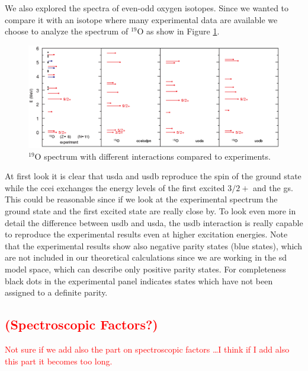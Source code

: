 \documentclass{llncs}
\begin{document}
We also explored the spectra of even-odd oxygen isotopes. Since we wanted to compare it with an isotope where many experimental data are available we choose to analyze the spectrum of $^{19}$O as show in Figure \ref{fig:19O}. 
\begin{figure}[htb!]
\centering
\includegraphics[width=\textwidth]{19O.eps}
\caption{$^{19}$O spectrum with different interactions compared to experiments.}
\label{fig:19O}
\end{figure}
At first look it is clear that usda and usdb reproduce the spin of the ground state while the ccei exchanges the energy levels of the first excited $3/2+$ and the gs. This could be reasonable since if we look at the experimental spectrum the ground state and the first excited state are really close by. To look even more in detail the difference between usdb and usda, the usdb interaction is really capable to reproduce the experimental results even at higher excitation energies. Note that the experimental results show also negative parity states (blue states), which are not included in our theoretical calculations since we are working in the sd model space, which can  describe only positive parity states. For completeness black dots in the experimental panel indicates states which have not been assigned to a definite parity.
%
\subsection{\textcolor{red}{(Spectroscopic Factors?)}}
\textcolor{red}{Not sure if we add also the part on spectroscopic factors \dots I think if I add also this part it becomes too long.}
%

%
\end{document}
